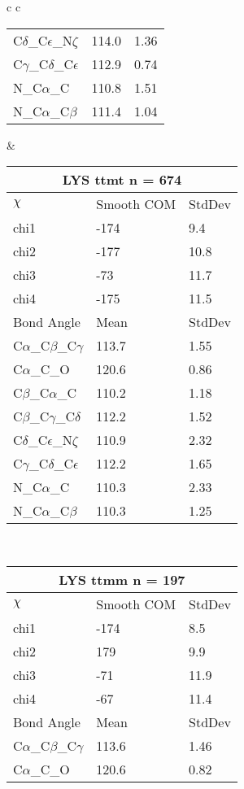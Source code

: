 \begin{longtable}{ c c }
\begin{tabular}{ l l l }
  C$\delta$\_C$\epsilon$\_N$\zeta$ & 114.0 & 1.36\\
  C$\gamma$\_C$\delta$\_C$\epsilon$ & 112.9 & 0.74\\
  N\_C$\alpha$\_C & 110.8 & 1.51\\
  N\_C$\alpha$\_C$\beta$ & 111.4 & 1.04\\
  \bottomrule
  \end{tabular}
  &
  \begin{tabular}{ l l l }
  \toprule
  \multicolumn{3}{c}{LYS \textbf{ttmt} n = 674} \\ \toprule
  $\chi$       & Smooth COM & StdDev \\ \midrule
  chi1 & -174 & 9.4 \\ 
  chi2 & -177 & 10.8 \\ 
  chi3 & -73 & 11.7 \\ 
  chi4 & -175 & 11.5 \\ \midrule
  Bond Angle   & Mean     & StdDev \\ \midrule
  C$\alpha$\_C$\beta$\_C$\gamma$ & 113.7 & 1.55\\
  C$\alpha$\_C\_O & 120.6 & 0.86\\
  C$\beta$\_C$\alpha$\_C & 110.2 & 1.18\\
  C$\beta$\_C$\gamma$\_C$\delta$ & 112.2 & 1.52\\
  C$\delta$\_C$\epsilon$\_N$\zeta$ & 110.9 & 2.32\\
  C$\gamma$\_C$\delta$\_C$\epsilon$ & 112.2 & 1.65\\
  N\_C$\alpha$\_C & 110.3 & 2.33\\
  N\_C$\alpha$\_C$\beta$ & 110.3 & 1.25\\
  \bottomrule
  \end{tabular}
  \\
  \begin{tabular}{ l l l }
  \toprule
  \multicolumn{3}{c}{LYS \textbf{ttmm} n = 197} \\ \toprule
  $\chi$       & Smooth COM & StdDev \\ \midrule
  chi1 & -174 & 8.5 \\ 
  chi2 & 179 & 9.9 \\ 
  chi3 & -71 & 11.9 \\ 
  chi4 & -67 & 11.4 \\ \midrule
  Bond Angle   & Mean     & StdDev \\ \midrule
  C$\alpha$\_C$\beta$\_C$\gamma$ & 113.6 & 1.46\\
  C$\alpha$\_C\_O & 120.6 & 0.82\\

\end{tabular}
\end{longtable}
